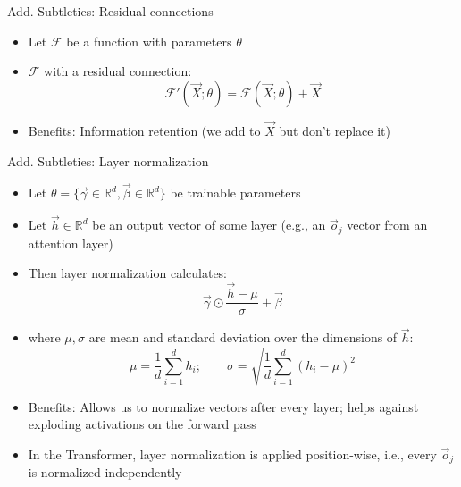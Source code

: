 \begin{vbframe}{Add. Subtleties: Residual connections}

\vfill

\begin{itemize}
\item Let $\mathcal{F}$ be a function with parameters $\theta$
\item $\mathcal{F}$ with a residual connection:
$$\mathcal{F}'(\vec X; \theta) = \mathcal{F}(\vec X; \theta) + \vec X$$
\begin{center}
\vfill
{}
\end{center}
\item Benefits: Information retention (we add to $\vec X$ but don't replace it) 
\end{itemize}

\vfill

\end{vbframe}


\begin{vbframe}{Add. Subtleties: Layer normalization}

\vfill

\begin{itemize}
\item Let $\theta = \{\vec \gamma \in \mathbb{R}^d, \vec \beta \in \mathbb{R}^d\}$ be trainable parameters
\item Let $\vec h \in \mathbb{R}^d$ be an output vector of some layer (e.g., an $\vec o_j$ vector from an attention layer)
\item Then layer normalization calculates:
$$ \vec \gamma \odot \frac{\vec h - \mu}{\sigma} + \vec \beta $$
\item where $\mu, \sigma$ are mean and standard deviation over the dimensions of $\vec h$:
$$ \mu = \frac{1}{d} \sum_{i=1}^d h_{i}; \qquad \sigma = \sqrt{\frac{1}{d} \sum_{i=1}^d (h_i - \mu)^2} $$
\item Benefits: Allows us to normalize vectors after every layer; helps against exploding activations on the forward pass
\item In the Transformer, layer normalization is applied position-wise, i.e., every $\vec o_j$ is normalized independently
\end{itemize}

\vfill

\end{vbframe}

